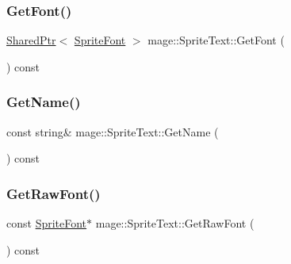 \subsubsection{\texorpdfstring{Get\+Font()}{GetFont()}}
{\footnotesize\ttfamily \hyperlink{namespacemage_a1e01ae66713838a7a67d30e44c67703e}{Shared\+Ptr}$<$ \hyperlink{classmage_1_1_sprite_font}{Sprite\+Font} $>$ mage\+::\+Sprite\+Text\+::\+Get\+Font (\begin{DoxyParamCaption}{ }\end{DoxyParamCaption}) const}

\hypertarget{classmage_1_1_sprite_text_ab9f289c7c70988da6acf031108ad4934}{}\label{classmage_1_1_sprite_text_ab9f289c7c70988da6acf031108ad4934} 
\subsubsection{\texorpdfstring{Get\+Name()}{GetName()}}
{\footnotesize\ttfamily const string\& mage\+::\+Sprite\+Text\+::\+Get\+Name (\begin{DoxyParamCaption}{ }\end{DoxyParamCaption}) const}

\hypertarget{classmage_1_1_sprite_text_ab67ba17af1b19766343d04f10853c8d6}{}\label{classmage_1_1_sprite_text_ab67ba17af1b19766343d04f10853c8d6} 
\subsubsection{\texorpdfstring{Get\+Raw\+Font()}{GetRawFont()}}
{\footnotesize\ttfamily const \hyperlink{classmage_1_1_sprite_font}{Sprite\+Font}$\ast$ mage\+::\+Sprite\+Text\+::\+Get\+Raw\+Font (\begin{DoxyParamCaption}{ }\end{DoxyParamCaption}) const\hspace{0.3cm}{\ttfamily [protected]}}

\hypertarget{classmage_1_1_sprite_text_a8a97ddf71ed3fd656f0f21b981f8e905}{}\label{classmage_1_1_sprite_text_a8a97ddf71ed3fd656f0f21b981f8e905} 
